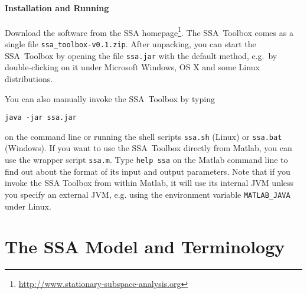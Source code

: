 \documentclass{article}
\newcommand{\1}{\ensuremath{\mathds{1}}}
\newcommand{\0}{\ensuremath{0}}
\begin{document}
\paragraph{Installation and Running}

Download the software from the SSA homepage\footnote{\url{http://www.stationary-subspace-analysis.org}}. 
The SSA~Toolbox comes as a single file \texttt{ssa\_toolbox-v0.1.zip}. 
After unpacking, you can start the SSA~Toolbox by opening the file \texttt{ssa.jar}
with the default method, e.g.~by double-clicking on it under Microsoft Windows, 
OS X and some Linux distributions.

You can also manually invoke the SSA~Toolbox by typing
\begin{center}
  \texttt{java -jar ssa.jar}
\end{center}
on the command line or running the shell scripts \texttt{ssa.sh} (Linux)
or \texttt{ssa.bat} (Windows). If you want to use the SSA~Toolbox directly from Matlab, 
you can use the wrapper script \texttt{ssa.m}. Type \texttt{help ssa} on the Matlab 
command line to find out about the format of its input and output parameters. 
Note that if you invoke the SSA Toolbox from within Matlab, it will use its
internal JVM unless you specify an external JVM, e.g. using the environment
variable \texttt{MATLAB\_JAVA} under Linux.

\section{The SSA Model and Terminology}
\end{document}
